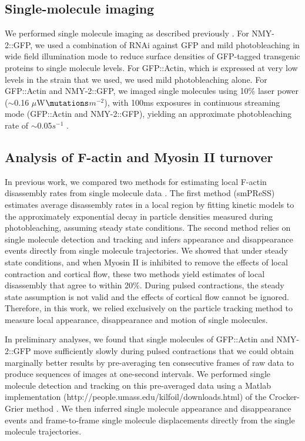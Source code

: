 \documentclass{ucetd}
\begin{document}
\subsection{Single-molecule imaging}
We performed single molecule imaging as described previously \cite{Robin:2014jf}. For NMY-2::GFP, we used a combination of RNAi against GFP and mild photobleaching in wide field illumination mode to reduce surface densities of GFP-tagged transgenic proteins to single molecule levels. For GFP::Actin, which is expressed at very low levels in the strain that we used, we used mild photobleaching alone. For GFP::Actin and NMY-2::GFP, we imaged single molecules using 10$\%$ laser power ($\sim$0.16 $\mu$W$\mutations$\(m^{-2}\)), with 100ms exposures in continuous streaming mode (GFP::Actin and NMY-2::GFP), yielding an approximate photobleaching rate of $\sim$0.05\(s^{-1}\) \cite{Robin:2014jf}.


\subsection{Analysis of F-actin and Myosin II turnover}
In previous work, we compared two methods for estimating local F-actin disassembly rates from single molecule data \cite{Robin:2014jf}. The first method (smPReSS) estimates average disassembly rates in a local region by fitting kinetic models to the approximately exponential decay in particle densities measured during photobleaching, assuming steady state conditions.  The second method relies on single molecule detection and tracking and infers appearance and disappearance events directly from single molecule trajectories.  We showed that under steady state conditions, and when Myosin II is inhibited to remove the effects of local contraction and cortical flow, these two methods yield estimates of local disassembly that agree to within 20$\%$.   During pulsed contractions, the steady state assumption is not valid and the  effects of cortical flow cannot be ignored.  Therefore, in this work, we relied exclusively on the particle tracking method to measure local appearance, disappearance and motion of single molecules.

In preliminary analyses, we found that single molecules of GFP::Actin and NMY-2::GFP move sufficiently slowly during pulsed contractions that we could obtain marginally better results by pre-averaging ten consecutive frames of raw data to produce sequences of images at one-second intervals.  We performed single molecule detection and tracking on this pre-averaged data using a Matlab implementation (http://people.umass.edu/kilfoil/downloads.html) of the Crocker-Grier method \cite{Crocker:1996wpa, Pelletier:2009tp}. We then inferred single molecule appearance and disappearance events and frame-to-frame single molecule displacements directly from the single molecule trajectories.
\end{document}
